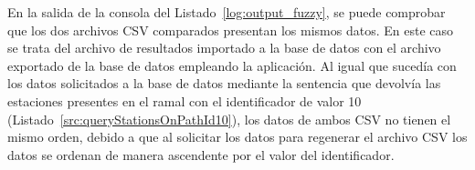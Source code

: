 En la salida de la consola del Listado~\ref{log:output_fuzzy}, se puede comprobar que los dos archivos \acrshort{CSV} comparados presentan los mismos datos. En este caso se trata del archivo de resultados importado a la base de datos con el archivo exportado de la base de datos empleando la aplicación. Al igual que sucedía con los datos solicitados a la base de datos mediante la sentencia que devolvía las estaciones presentes en el ramal con el identificador de valor 10 (Listado~\ref{src:queryStationsOnPathId10}), los datos de ambos \acrshort{CSV} no tienen el mismo orden, debido a que al solicitar los datos para regenerar el archivo \acrshort{CSV} los datos se ordenan de manera ascendente por el valor del identificador.